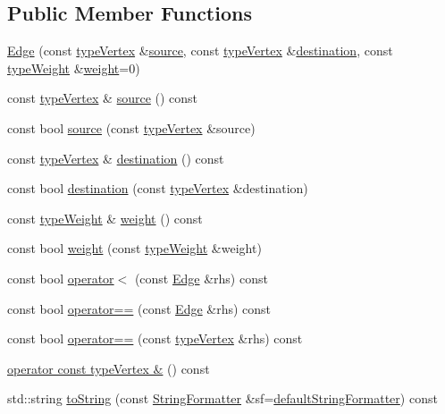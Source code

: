 \subsection*{Public Member Functions}
\begin{DoxyCompactItemize}
\item 
\hyperlink{classEdge_a2fabe9d380a34f8127308d4f578872fd}{Edge} (const \hyperlink{edge_8h_a5fbd20c46956d479cb10afc9855223f6}{type\+Vertex} \&\hyperlink{classEdge_ad949d0cbd81ca43e8043b066b0d167d3}{source}, const \hyperlink{edge_8h_a5fbd20c46956d479cb10afc9855223f6}{type\+Vertex} \&\hyperlink{classEdge_ac1389c34d05a890f9fd84dacba3df06b}{destination}, const \hyperlink{edge_8h_a2e7ea3be891ac8b52f749ec73fee6dd2}{type\+Weight} \&\hyperlink{classEdge_a9d5634336c89578f1bbbfce20c3938a7}{weight}=0)
\item 
const \hyperlink{edge_8h_a5fbd20c46956d479cb10afc9855223f6}{type\+Vertex} \& \hyperlink{classEdge_ad949d0cbd81ca43e8043b066b0d167d3}{source} () const
\item 
const bool \hyperlink{classEdge_a2e5c29247138f730c3ca13cc0220b97c}{source} (const \hyperlink{edge_8h_a5fbd20c46956d479cb10afc9855223f6}{type\+Vertex} \&source)
\item 
const \hyperlink{edge_8h_a5fbd20c46956d479cb10afc9855223f6}{type\+Vertex} \& \hyperlink{classEdge_ac1389c34d05a890f9fd84dacba3df06b}{destination} () const
\item 
const bool \hyperlink{classEdge_a98a9a06f7ed7da370d809fdb1b4c55ce}{destination} (const \hyperlink{edge_8h_a5fbd20c46956d479cb10afc9855223f6}{type\+Vertex} \&destination)
\item 
const \hyperlink{edge_8h_a2e7ea3be891ac8b52f749ec73fee6dd2}{type\+Weight} \& \hyperlink{classEdge_a9d5634336c89578f1bbbfce20c3938a7}{weight} () const
\item 
const bool \hyperlink{classEdge_abaf02f474e1cdc61f3baf06875b4f38c}{weight} (const \hyperlink{edge_8h_a2e7ea3be891ac8b52f749ec73fee6dd2}{type\+Weight} \&weight)
\item 
const bool \hyperlink{classEdge_a97799770a75ae0d09208203bdeb6cfee}{operator$<$} (const \hyperlink{classEdge}{Edge} \&rhs) const
\item 
const bool \hyperlink{classEdge_abe84b58ced477ebeef5078e4cb48b49f}{operator==} (const \hyperlink{classEdge}{Edge} \&rhs) const
\item 
const bool \hyperlink{classEdge_aa05a0ee020bc6c31ed604c2d4bed8319}{operator==} (const \hyperlink{edge_8h_a5fbd20c46956d479cb10afc9855223f6}{type\+Vertex} \&rhs) const
\item 
\hyperlink{classEdge_ac7e484c142c7453bed01a18b03053998}{operator const type\+Vertex \&} () const
\item 
std\+::string \hyperlink{classEdge_a06b741951595a14e27691999ff82957e}{to\+String} (const \hyperlink{classStringFormatter}{String\+Formatter} \&sf=\hyperlink{stringFormatter_8h_abf1349c8e24162d0134072aff288f2a2}{default\+String\+Formatter}) const
\end{DoxyCompactItemize}
